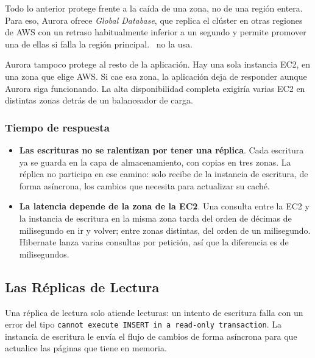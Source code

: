 \documentclass[12pt,a4paper]{article}
\begin{document}
Todo lo anterior protege frente a la caída de una zona, no de una región entera. Para eso, Aurora ofrece \textit{Global Database}, que replica el clúster en otras regiones de AWS con un retraso habitualmente inferior a un segundo y permite promover una de ellas si falla la región principal. \proyecto~no la usa.

Aurora tampoco protege al resto de la aplicación. Hay una sola instancia EC2, en una zona que elige AWS. Si cae esa zona, la aplicación deja de responder aunque Aurora siga funcionando. La alta disponibilidad completa exigiría varias EC2 en distintas zonas detrás de un balanceador de carga.

\subsubsection{Tiempo de respuesta}

\begin{itemize}
    \item \textbf{Las escrituras no se ralentizan por tener una réplica}. Cada escritura ya se guarda en la capa de almacenamiento, con copias en tres zonas. La réplica no participa en ese camino: solo recibe de la instancia de escritura, de forma asíncrona, los cambios que necesita para actualizar su caché.
    \item \textbf{La latencia depende de la zona de la EC2}. Una consulta entre la EC2 y la instancia de escritura en la misma zona tarda del orden de décimas de milisegundo en ir y volver; entre zonas distintas, del orden de un milisegundo. Hibernate lanza varias consultas por petición, así que la diferencia es de milisegundos.
\end{itemize}

\subsection{Las Réplicas de Lectura}\label{sec:readers}

Una réplica de lectura solo atiende lecturas: un intento de escritura falla con un error del tipo \texttt{cannot execute INSERT in a read-only transaction}. La instancia de escritura le envía el flujo de cambios de forma asíncrona para que actualice las páginas que tiene en memoria.
\end{document}
